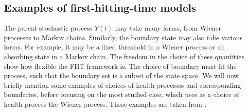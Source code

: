 \subsection{Examples of first-hitting-time models}\label{subsec:fht-examples}
The parent stochastic process $Y(t)$ may take many forms, from Wiener processes to Markov chains.
Similarly, the boundary state may also take various forms.
For example, it may be a fixed threshold in a Wiener process or an absorbing state in a Markov chain.
The freedom in the choice of these quantities show how flexible the FHT framework is.
The choice of boundary must fit the process, such that the boundary set is a subset of the state space.
We will now briefly mention some examples of choices of health processes and corresponding boundaries, before focusing on the most studied case, which uses as a choice of health process the Wiener process.
These examples are taken from \citet{leewhitmore2006}.

